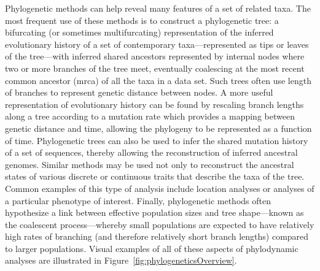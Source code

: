 Phylogenetic methods can help reveal many features of a set of related taxa.
The most frequent use of these methods is to construct a phylogenetic tree: a bifurcating (or sometimes multifurcating) representation of the inferred evolutionary history of a set of contemporary taxa---represented as tips or leaves of the tree---with inferred shared ancestors represented by internal nodes where two or more branches of the tree meet, eventually coalescing at the most recent common ancestor (\gls{mrca}) of all the taxa in a data set.
Such trees often use length of branches to represent genetic distance between nodes.
A more useful representation of evolutionary history can be found by rescaling branch lengths along a tree according to a mutation rate which provides a mapping between genetic distance and time, allowing the phylogeny to be represented as a function of time.
Phylogenetic trees can also be used to infer the shared mutation history of a set of sequences, thereby allowing the reconstruction of inferred ancestral genomes.
Similar methods may be used not only to reconstruct the ancestral states of various discrete or continuous traits that describe the taxa of the tree.
Common examples of this type of analysis include location analyses %
or analyses of a particular phenotype of interest.
Finally, phylogenetic methods often hypothesize a link between effective population sizes and tree shape---known as the coalescent process---whereby small populations are expected to have relatively high rates of branching (and therefore relatively short branch lengths) compared to larger populations.
Visual examples of all of these aspects of phylodynamic analyses are illustrated in Figure~\ref{fig:phylogeneticsOverview}.

